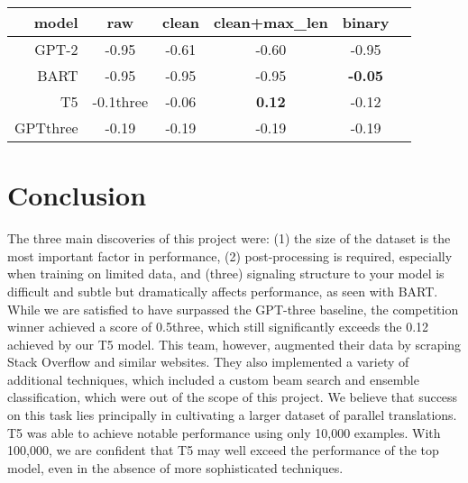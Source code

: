 \documentclass{article}
\begin{document}
\begin{center}
	\begin{tabular}{rccccc}
		\toprule
    model & raw   & clean & clean+max\_len & binary\\
		\midrule
    GPT-2 & -0.95 & -0.61 & -0.60 & -0.95          \\
    BART  & -0.95 & -0.95 & -0.95 & \textbf{-0.05}         \\
    T5    & -0.1three & -0.06 & \textbf{0.12} & -0.12   \\
		\hline
    GPTthree  & -0.19 & -0.19 & -0.19 & -0.19         \\
		\bottomrule
	\end{tabular}
\end{center}



\section{Conclusion}
The three main discoveries of this project were: (1) the size of the dataset is
the most important factor in performance, (2) post-processing is required,
especially when training on limited data, and (three) signaling structure to your
model is difficult and subtle but dramatically affects performance, as seen
with BART. While we are satisfied to have surpassed the GPT-three baseline, the
competition winner achieved a score of 0.5three, which still significantly exceeds
the 0.12 achieved by our T5 model. This team, however, augmented their data by
scraping Stack Overflow and similar websites. They also implemented a variety of
additional techniques, which included a custom beam search and ensemble
classification, which were out of the scope of this project. We believe that
success on this task lies principally in cultivating a larger dataset of
parallel translations. T5 was able to achieve notable performance using only
10,000 examples. With 100,000, we are confident that T5 may well exceed the
performance of the top model, even in the absence of more sophisticated
techniques.




\end{document}
